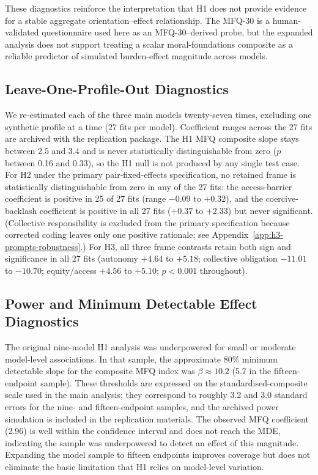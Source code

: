 These diagnostics reinforce the interpretation that H1 does not provide evidence for a stable aggregate orientation--effect relationship. The MFQ-30 is a human-validated questionnaire used here as an MFQ-30--derived probe, but the expanded analysis does not support treating a scalar moral-foundations composite as a reliable predictor of simulated burden-effect magnitude across models.


\subsection{Leave-One-Profile-Out Diagnostics}

We re-estimated each of the three main models twenty-seven times, excluding one synthetic profile at a time (27 fits per model). Coefficient ranges across the 27 fits are archived with the replication package. The H1 MFQ composite slope stays between 2.5 and 3.4 and is never statistically distinguishable from zero ($p$ between 0.16 and 0.33), so the H1 null is not produced by any single test case. For H2 under the primary pair-fixed-effects specification, no retained frame is statistically distinguishable from zero in any of the 27 fits: the access-barrier coefficient is positive in 25 of 27 fits (range $-0.09$ to $+0.32$), and the coercive-backlash coefficient is positive in all 27 fits ($+0.37$ to $+2.33$) but never significant. (Collective responsibility is excluded from the primary specification because corrected coding leaves only one positive rationale; see Appendix~\ref{app:h3-prompts-robustness}.) For H3, all three frame contrasts retain both sign and significance in all 27 fits (autonomy $+4.64$ to $+5.18$; collective obligation $-11.01$ to $-10.70$; equity/access $+4.56$ to $+5.10$; $p<0.001$ throughout).

\subsection{Power and Minimum Detectable Effect Diagnostics}
\label{app:h1-power}

The original nine-model H1 analysis was underpowered for small or moderate model-level associations. In that sample, the approximate 80\% minimum detectable slope for the composite MFQ index was \(\beta \approx 10.2\) (5.7 in the fifteen-endpoint sample). These thresholds are expressed on the standardised-composite scale used in the main analysis; they correspond to roughly 3.2 and 3.0 standard errors for the nine- and fifteen-endpoint samples, and the archived power simulation is included in the replication materials. The observed MFQ coefficient (2.96) is well within the confidence interval and does not reach the MDE, indicating the sample was underpowered to detect an effect of this magnitude. Expanding the model sample to fifteen endpoints improves coverage but does not eliminate the basic limitation that H1 relies on model-level variation.

